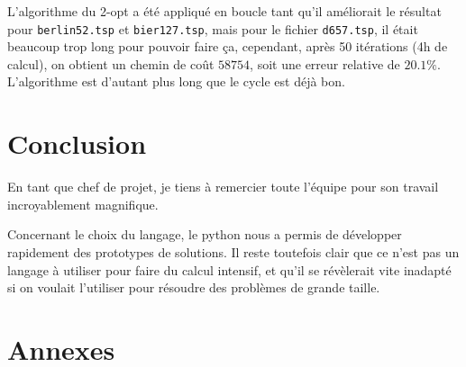 \documentclass{scrartcl}
\begin{document}
    L'algorithme du 2-opt a été appliqué en boucle tant qu'il améliorait le
    résultat pour \verb+berlin52.tsp+ et \verb+bier127.tsp+, mais pour le
    fichier \verb+d657.tsp+, il était beaucoup trop long pour pouvoir faire ça,
    cependant, après 50 itérations (4h de calcul), on obtient un chemin de coût
    $58754$, soit une erreur relative de $20.1\%$. L'algorithme est d'autant
    plus long que le cycle est déjà bon.

\section{Conclusion}
  En tant que chef de projet, je tiens à remercier toute l'équipe pour son travail incroyablement magnifique.

  Concernant le choix du langage, le python nous a permis de développer rapidement des prototypes de solutions.
  Il reste toutefois clair que ce n'est pas un langage à utiliser pour faire du calcul intensif, et qu'il se révèlerait vite
  inadapté si on voulait l'utiliser pour résoudre des problèmes de grande taille.

\section{Annexes}
  \lstlistoflistings
  
  
  
  
  
  
  
\end{document}
